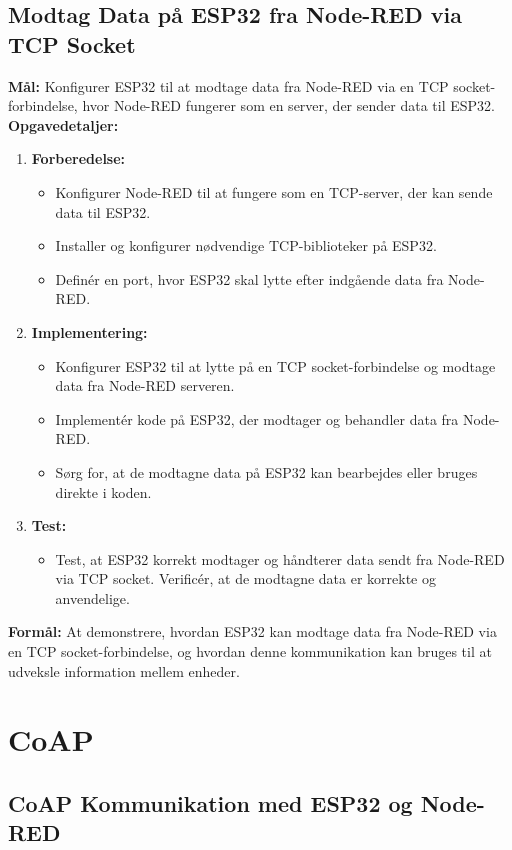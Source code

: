 \documentclass[12pt,a4paper]{book}
\begin{document}
	\subsection*{Modtag Data på ESP32 fra Node-RED via TCP Socket}
	\textbf{Mål:} Konfigurer ESP32 til at modtage data fra Node-RED via en TCP socket-forbindelse, hvor Node-RED fungerer som en server, der sender data til ESP32.
	\newline\newline\noindent
	\textbf{Opgavedetaljer:}
	\begin{enumerate}
		\item \textbf{Forberedelse:}
		\begin{itemize}
			\item Konfigurer Node-RED til at fungere som en TCP-server, der kan sende data til ESP32.
			\item Installer og konfigurer nødvendige TCP-biblioteker på ESP32.
			\item Definér en port, hvor ESP32 skal lytte efter indgående data fra Node-RED.
		\end{itemize}
		\item \textbf{Implementering:}
		\begin{itemize}
			\item Konfigurer ESP32 til at lytte på en TCP socket-forbindelse og modtage data fra Node-RED serveren.
			\item Implementér kode på ESP32, der modtager og behandler data fra Node-RED.
			\item Sørg for, at de modtagne data på ESP32 kan bearbejdes eller bruges direkte i koden.
		\end{itemize}
		\item \textbf{Test:}
		\begin{itemize}
			\item Test, at ESP32 korrekt modtager og håndterer data sendt fra Node-RED via TCP socket. Verificér, at de modtagne data er korrekte og anvendelige.
		\end{itemize}
	\end{enumerate}
	\textbf{Formål:} At demonstrere, hvordan ESP32 kan modtage data fra Node-RED via en TCP socket-forbindelse, og hvordan denne kommunikation kan bruges til at udveksle information mellem enheder.
	
	\section{CoAP}
	\subsection*{CoAP Kommunikation med ESP32 og Node-RED}
\end{document}
